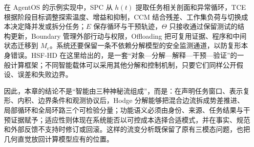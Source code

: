 在 AgentOS 的示例实现中，SPC 从 $h(t)$ 提取任务相关剖面和异常循环，TCE 根据阶段目标调整探索温度、增益和抑制，CCM 结合残差、工作集负荷与切换成本决定降并发或拆分任务；$E$ 保存循环与干预轨迹，$\Theta$ 只接收通过保留测试的结构更新，Boundary 管理外部行动与权限，Offloading 把可复用证据、程序和中间状态迁移到 $M_e$。系统还要保留一条不依赖分解模型的安全监测通道，以防复形本身错误。HSF-HD 在这里给出的，是一套“对象—分解—解释—干预—验证”的一般计算框架；不同智能载体可以采用其他分解和控制机制，只要它们同样公开假设、误差和失败边界。

因此，本章的结论不是“智能由三种神秘流组成”，而是：在声明任务窗口、表示复形、内积、边界条件和观测协议后，Hodge 分解能够把混合边流拆成势差推进、局部循环和全局环路三个可检验分量；功能语义必须由身份、来源、任务结果与干预证据赋予；适应性则体现在系统能否以可控成本选择合适模式，并在事实、规范和外部反馈不支持时修订或回滚。这样的流变分析既保留了原有三模态问题，也把几何直觉放回计算模型应有的位置。

